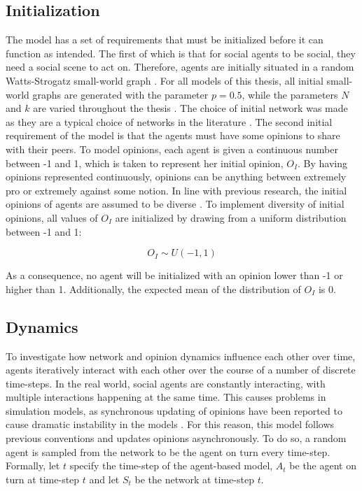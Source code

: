 \documentclass[11pt]{article}
\begin{document}
\subsection{Initialization}
The model has a set of requirements that must be initialized before it can function as intended. The first of which is that for social agents to be social, they need a social scene to act on. Therefore, agents are initially situated in a random Watts-Strogatz small-world graph \cite{watts_collective_1998}. For all models of this thesis, all initial small-world graphs are generated with the parameter $p=0.5$, while the parameters $N$ and $k$ are varied throughout the thesis \cite{watts_collective_1998}. The choice of initial network was made as they are a typical choice of networks in the literature \cite{turner_paths_2018, flache_models_2017}.
The second initial requirement of the model is that the agents must have some opinions to share with their peers. To model opinions, each agent is given a continuous number between -1 and 1, which is taken to represent her initial opinion, $O_I$. By having opinions represented continuously, opinions can be anything between extremely pro or extremely against some notion. 
In line with previous research, the initial opinions of agents are assumed to be diverse \cite{galesic_integrating_2021, flache_models_2017, flache_between_2018}. To implement diversity of initial opinions, all values of $O_I$ are initialized by drawing from a uniform distribution between -1 and 1: 

$$O_I \sim U(-1, 1)$$

\noindent As a consequence, no agent will be initialized with an opinion lower than -1 or higher than 1. Additionally, the expected mean of the distribution of $O_I$ is 0.

\subsection{Dynamics}
\label{dynamics}
To investigate how network and opinion dynamics influence each other over time, agents iteratively interact with each other over the course of a number of discrete time-steps. 
In the real world, social agents are constantly interacting, with multiple interactions happening at the same time. This causes problems in simulation models, as synchronous updating of opinions have been reported to cause dramatic instability in the models \cite{flache_models_2017, sasahara_social_2021, galesic_integrating_2021}. For this reason, this model follows previous conventions and updates opinions asynchronously. To do so, a random agent is sampled from the network to be the agent on turn every time-step.
Formally, let $t$ specify the time-step of the agent-based model, $A_t$ be the agent on turn at time-step $t$ and let $S_t$ be the network at time-step $t$.
\end{document}
